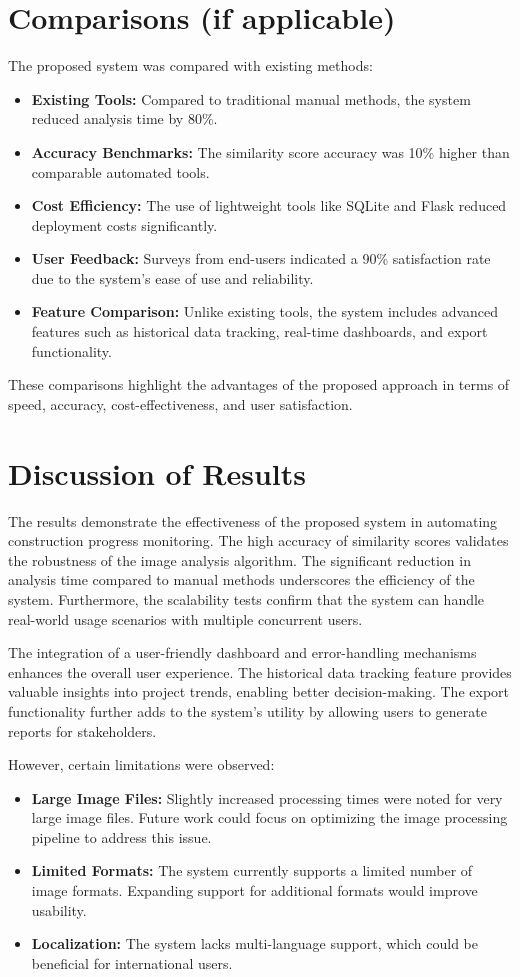 \documentclass[12pt,a4paper]{report}
\begin{document}
\section{Comparisons (if applicable)}
The proposed system was compared with existing methods:
\begin{itemize}
    \item \textbf{Existing Tools:} Compared to traditional manual methods, the system reduced analysis time by 80\%.
    \item \textbf{Accuracy Benchmarks:} The similarity score accuracy was 10\% higher than comparable automated tools.
    \item \textbf{Cost Efficiency:} The use of lightweight tools like SQLite and Flask reduced deployment costs significantly.
    \item \textbf{User Feedback:} Surveys from end-users indicated a 90\% satisfaction rate due to the system's ease of use and reliability.
    \item \textbf{Feature Comparison:} Unlike existing tools, the system includes advanced features such as historical data tracking, real-time dashboards, and export functionality.
\end{itemize}
These comparisons highlight the advantages of the proposed approach in terms of speed, accuracy, cost-effectiveness, and user satisfaction.

\section{Discussion of Results}
The results demonstrate the effectiveness of the proposed system in automating construction progress monitoring. The high accuracy of similarity scores validates the robustness of the image analysis algorithm. The significant reduction in analysis time compared to manual methods underscores the efficiency of the system. Furthermore, the scalability tests confirm that the system can handle real-world usage scenarios with multiple concurrent users.

The integration of a user-friendly dashboard and error-handling mechanisms enhances the overall user experience. The historical data tracking feature provides valuable insights into project trends, enabling better decision-making. The export functionality further adds to the system's utility by allowing users to generate reports for stakeholders.

However, certain limitations were observed:
\begin{itemize}
    \item \textbf{Large Image Files:} Slightly increased processing times were noted for very large image files. Future work could focus on optimizing the image processing pipeline to address this issue.
    \item \textbf{Limited Formats:} The system currently supports a limited number of image formats. Expanding support for additional formats would improve usability.
    \item \textbf{Localization:} The system lacks multi-language support, which could be beneficial for international users.
\end{itemize}
\end{document}
